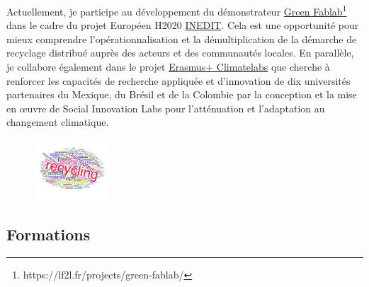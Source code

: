 \documentclass[
  11pt,
]{article}
\begin{document}
Actuellement, je participe au développement du démonstrateur
\href{https://lf2l.fr/projects/green-fablab/}{Green Fablab}\footnote{https://lf2l.fr/projects/green-fablab/}
dans le cadre du projet Européen H2020
\href{http://erpi.univ-lorraine.fr/projects/INEDIT/}{INEDIT}. Cela est
une opportunité pour mieux comprendre l'opérationnalisation et la
démultiplication de la démarche de recyclage distribué auprès des
acteurs et des communautés locales. En parallèle, je collabore également
dans le projet
\href{https://erpi.univ-lorraine.fr/fr/projects/Climatelabs/}{Erasmus+
Climatelabs} que cherche à renforcer les capacités de recherche
appliquée et d'innovation de dix universités partenaires du Mexique, du
Brésil et de la Colombie par la conception et la mise en œuvre de Social
Innovation Labs pour l'atténuation et l'adaptation au changement
climatique.

\begin{figure}[H]

{\centering \includegraphics[width=0.25\textwidth,height=\textheight]{Figures/Cloud.png}

}

\end{figure}

\hypertarget{formations}{%
\subsection{Formations}\label{formations}}
\end{document}
